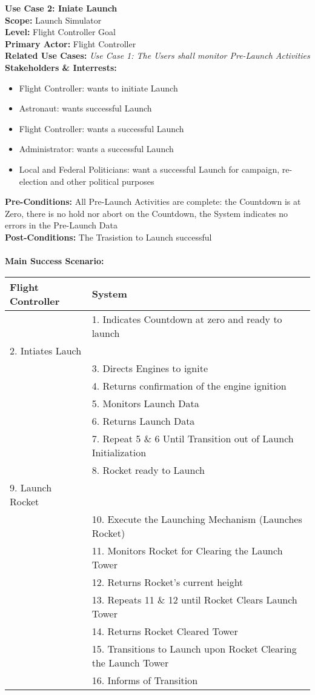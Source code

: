 \documentclass[letterpaper]{article}
\begin{document}
\noindent
\textbf{Use Case 2:  Iniate Launch}\\
\textbf{Scope:  }Launch Simulator\\
\textbf{Level:  }Flight Controller Goal\\
\textbf{Primary Actor:  }Flight Controller\\
\textbf{Related Use Cases:  }\textit{Use Case 1:  The Users shall
monitor Pre-Launch Activities}\\
\textbf{Stakeholders \& Interrests:  }
\begin{itemize}
\item Flight Controller:  wants to initiate Launch
\item Astronaut:  wants successful Launch
\item Flight Controller:  wants a successful Launch
\item Administrator:  wants a successful Launch
\item Local and Federal Politicians:  want a successful Launch for
campaign, re-election and other political purposes
\end{itemize}
\textbf{Pre-Conditions:  }All Pre-Launch Activities are complete:  the
Countdown is at Zero, there is no hold nor abort on the Countdown, the
System indicates no errors in the Pre-Launch Data\\
\textbf{Post-Conditions:  }The Trasistion to Launch successful\\\\
\textbf{Main Success Scenario:  }\\
\begin{tabular}{|p{5.75cm}|p{5.75cm}|}\hline
\textbf{Flight Controller} & \textbf{System}\\\hline
&1.  Indicates Countdown at zero and ready to launch\\\hline
2. Intiates Lauch & \\\hline
& 3.  Directs Engines to ignite\\\hline
& 4.  Returns confirmation of the engine ignition\\\hline
& 5.  Monitors Launch Data\\\hline
& 6.  Returns Launch Data\\\hline
& 7.  Repeat 5 \& 6 Until Transition out of Launch
Initialization\\\hline
& 8.  Rocket ready to Launch\\\hline
9. Launch Rocket &\\\hline
& 10.   Execute the Launching Mechanism (Launches Rocket)\\\hline
& 11.  Monitors Rocket for Clearing the Launch Tower\\\hline
& 12.  Returns Rocket's current height\\\hline
& 13.  Repeats 11 \& 12 until Rocket Clears Launch Tower\\\hline
& 14.  Returns Rocket Cleared Tower\\\hline
& 15.  Transitions to Launch upon Rocket Clearing the Launch
Tower\\\hline
& 16.  Informs of Transition\\\hline 
\end{tabular}
\end{document}

